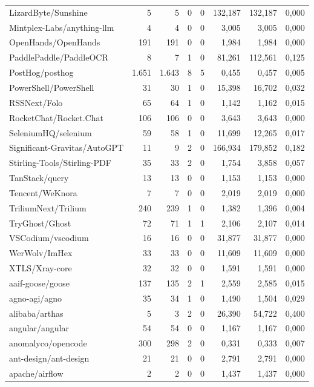 \begin{tabular}{lrrrrrrr}
LizardByte/Sunshine & 5 & 5 & 0 & 0 & 132,187 & 132,187 & 0,000 \\
Mintplex-Labs/anything-llm & 4 & 4 & 0 & 0 & 3,005 & 3,005 & 0,000 \\
OpenHands/OpenHands & 191 & 191 & 0 & 0 & 1,984 & 1,984 & 0,000 \\
PaddlePaddle/PaddleOCR & 8 & 7 & 1 & 0 & 81,261 & 112,561 & 0,125 \\
PostHog/posthog & 1.651 & 1.643 & 8 & 5 & 0,455 & 0,457 & 0,005 \\
PowerShell/PowerShell & 31 & 30 & 1 & 0 & 15,398 & 16,702 & 0,032 \\
RSSNext/Folo & 65 & 64 & 1 & 0 & 1,142 & 1,162 & 0,015 \\
RocketChat/Rocket.Chat & 106 & 106 & 0 & 0 & 3,643 & 3,643 & 0,000 \\
SeleniumHQ/selenium & 59 & 58 & 1 & 0 & 11,699 & 12,265 & 0,017 \\
Significant-Gravitas/AutoGPT & 11 & 9 & 2 & 0 & 166,934 & 179,852 & 0,182 \\
Stirling-Tools/Stirling-PDF & 35 & 33 & 2 & 0 & 1,754 & 3,858 & 0,057 \\
TanStack/query & 13 & 13 & 0 & 0 & 1,153 & 1,153 & 0,000 \\
Tencent/WeKnora & 7 & 7 & 0 & 0 & 2,019 & 2,019 & 0,000 \\
TriliumNext/Trilium & 240 & 239 & 1 & 0 & 1,382 & 1,396 & 0,004 \\
TryGhost/Ghost & 72 & 71 & 1 & 1 & 2,106 & 2,107 & 0,014 \\
VSCodium/vscodium & 16 & 16 & 0 & 0 & 31,877 & 31,877 & 0,000 \\
WerWolv/ImHex & 33 & 33 & 0 & 0 & 11,609 & 11,609 & 0,000 \\
XTLS/Xray-core & 32 & 32 & 0 & 0 & 1,591 & 1,591 & 0,000 \\
aaif-goose/goose & 137 & 135 & 2 & 1 & 2,559 & 2,585 & 0,015 \\
agno-agi/agno & 35 & 34 & 1 & 0 & 1,490 & 1,504 & 0,029 \\
alibaba/arthas & 5 & 3 & 2 & 0 & 26,390 & 54,722 & 0,400 \\
angular/angular & 54 & 54 & 0 & 0 & 1,167 & 1,167 & 0,000 \\
anomalyco/opencode & 300 & 298 & 2 & 0 & 0,331 & 0,333 & 0,007 \\
ant-design/ant-design & 21 & 21 & 0 & 0 & 2,791 & 2,791 & 0,000 \\
apache/airflow & 2 & 2 & 0 & 0 & 1,437 & 1,437 & 0,000 \\

\end{tabular}
